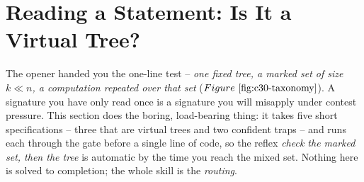 \section{Reading a Statement: Is It a Virtual Tree?}\label{sec:c30-recognition}

\begin{previouslybox}
The opener handed you the one-line test -- \emph{one fixed tree, a marked set of size
\(k\ll n\), a computation repeated over that set} (\(\figref{c30-taxonomy}\)).  A
signature you have only read once is a signature you will misapply under contest
pressure.  This section does the boring, load-bearing thing: it takes five short
specifications -- three that are virtual trees and two confident traps -- and runs
each through the gate before a single line of code, so the reflex \emph{check the
marked set, then the tree} is automatic by the time you reach the mixed set.
Nothing here is solved to completion; the whole skill is the \emph{routing}.
\end{previouslybox}

